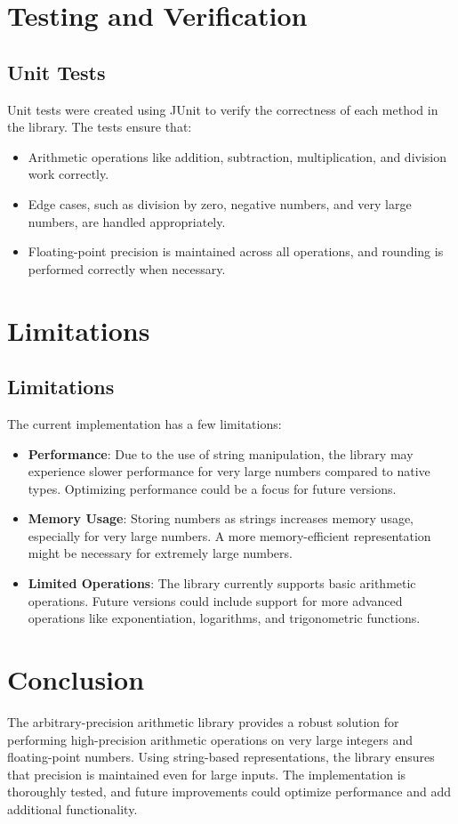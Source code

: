 \documentclass[12pt]{article}
\begin{document}
\section{Testing and Verification}

\subsection{Unit Tests}
Unit tests were created using JUnit to verify the correctness of each method in the library. The tests ensure that:
\begin{itemize}
    \item Arithmetic operations like addition, subtraction, multiplication, and division work correctly.
    \item Edge cases, such as division by zero, negative numbers, and very large numbers, are handled appropriately.
    \item Floating-point precision is maintained across all operations, and rounding is performed correctly when necessary.
\end{itemize}

\section{Limitations}

\subsection{Limitations}
The current implementation has a few limitations:
\begin{itemize}
    \item \textbf{Performance}: Due to the use of string manipulation, the library may experience slower performance for very large numbers compared to native types. Optimizing performance could be a focus for future versions.
    \item \textbf{Memory Usage}: Storing numbers as strings increases memory usage, especially for very large numbers. A more memory-efficient representation might be necessary for extremely large numbers.
    \item \textbf{Limited Operations}: The library currently supports basic arithmetic operations. Future versions could include support for more advanced operations like exponentiation, logarithms, and trigonometric functions.
\end{itemize}


\section{Conclusion}
The arbitrary-precision arithmetic library provides a robust solution for performing high-precision arithmetic operations on very large integers and floating-point numbers. Using string-based representations, the library ensures that precision is maintained even for large inputs. The implementation is thoroughly tested, and future improvements could optimize performance and add additional functionality.
\end{document}
